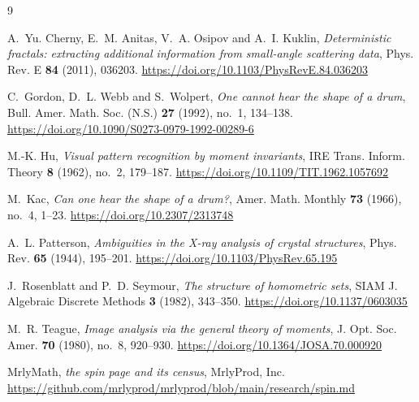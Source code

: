 \documentclass[11pt]{amsart}
\theoremstyle{definition}
\theoremstyle{remark}
\begin{document}
\begin{thebibliography}{9}

A.~Yu. Cherny, E.~M. Anitas, V.~A. Osipov and A.~I. Kuklin, \emph{Deterministic fractals: extracting additional information from small-angle scattering data}, Phys. Rev. E \textbf{84} (2011), 036203. \url{https://doi.org/10.1103/PhysRevE.84.036203}

C.~Gordon, D.~L. Webb and S.~Wolpert, \emph{One cannot hear the shape of a drum}, Bull. Amer. Math. Soc. (N.S.) \textbf{27} (1992), no.~1, 134--138. \url{https://doi.org/10.1090/S0273-0979-1992-00289-6}

M.-K. Hu, \emph{Visual pattern recognition by moment invariants}, IRE Trans. Inform. Theory \textbf{8} (1962), no.~2, 179--187. \url{https://doi.org/10.1109/TIT.1962.1057692}

M.~Kac, \emph{Can one hear the shape of a drum?}, Amer. Math. Monthly \textbf{73} (1966), no.~4, 1--23. \url{https://doi.org/10.2307/2313748}

A.~L. Patterson, \emph{Ambiguities in the X-ray analysis of crystal structures}, Phys. Rev. \textbf{65} (1944), 195--201. \url{https://doi.org/10.1103/PhysRev.65.195}

J.~Rosenblatt and P.~D. Seymour, \emph{The structure of homometric sets}, SIAM J. Algebraic Discrete Methods \textbf{3} (1982), 343--350. \url{https://doi.org/10.1137/0603035}

M.~R. Teague, \emph{Image analysis via the general theory of moments}, J. Opt. Soc. Amer. \textbf{70} (1980), no.~8, 920--930. \url{https://doi.org/10.1364/JOSA.70.000920}

MrlyMath, \emph{the spin page and its census}, MrlyProd, Inc. \url{https://github.com/mrlyprod/mrlyprod/blob/main/research/spin.md}

\end{thebibliography}
\end{document}
